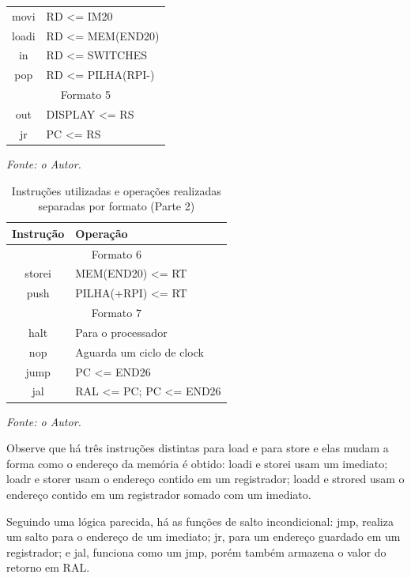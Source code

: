 \documentclass[
	12pt,				%
	oneside,
	a4paper,			%
	english,			%
	french,				%
	spanish,			%
	brazil,				%
	]{abntex2}
\begin{document}
\begin{table}[H]
\begin{tabular}{|c|>{\raggedright\arraybackslash}p{7cm}|}
\hline
movi & RD <= IM20 \\
loadi & RD <= MEM(END20) \\
in & RD <= SWITCHES \\
pop & RD <= PILHA(RPI-) \\
\hline
\multicolumn{2}{|c|}{Formato 5} \\
\hline
out & DISPLAY <= RS \\
jr & PC <= RS \\
\hline
\end{tabular}
\vspace{-0.5em}
\begin{center}
\textit{Fonte: o Autor.}
\end{center}
\end{table}


\setlength{\tabcolsep}{10pt}
\begin{table}[H]
\centering
\caption{Instruções utilizadas e operações realizadas separadas por formato (Parte 2)}
\label{opcode2}
\begin{tabular}{|c|>{\raggedright\arraybackslash}p{7cm}|}
\hline
Instrução & Operação\\
\hline
\multicolumn{2}{|c|}{Formato 6} \\
\hline
storei & MEM(END20) <= RT \\
push & PILHA(+RPI) <= RT \\
\hline
\multicolumn{2}{|c|}{Formato 7} \\
\hline
halt & Para o processador \\
nop & Aguarda um ciclo de clock \\
jump & PC <= END26 \\
jal & RAL <= PC; PC <= END26 \\
\hline
\end{tabular}
\vspace{-0.5em}
\begin{center}
\textit{Fonte: o Autor.}
\end{center}
\end{table}

Observe que há três instruções distintas para load e para store e elas mudam a forma como o endereço da memória é obtido: loadi e storei usam um imediato; loadr e storer usam o endereço contido em um registrador; loadd e strored usam o endereço contido em um registrador somado com um imediato. 

Seguindo uma lógica parecida, há as funções de salto incondicional: jmp, realiza um salto para o endereço de um imediato; jr, para um endereço guardado em um registrador; e jal, funciona como um jmp, porém também armazena o valor do retorno em RAL.
\end{document}
